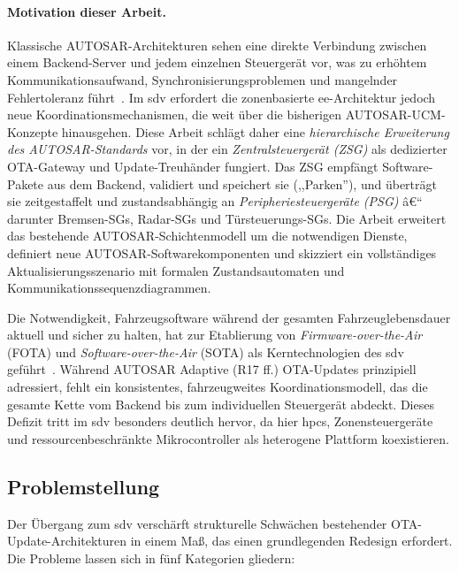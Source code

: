 ﻿\documentclass[12pt,a4paper,twoside]{article}
\begin{document}
\paragraph{Motivation dieser Arbeit.}
Klassische AUTOSAR-Architekturen sehen eine direkte Verbindung zwischen
einem Backend-Server und jedem einzelnen Steuergerät vor, was zu
erhöhtem Kommunikationsaufwand, Synchronisierungsproblemen und
mangelnder Fehlertoleranz führt~\cite{schneider2026ladekomm}. Im \gls{sdv}
erfordert die zonenbasierte \gls{ee}-Architektur jedoch neue
Koordinationsmechanismen, die weit über die bisherigen AUTOSAR-UCM-Konzepte
hinausgehen. Diese Arbeit schlägt daher eine
\emph{hierarchische Erweiterung des AUTOSAR-Standards} vor, in der ein
\emph{Zentralsteuergerät (ZSG)} als dedizierter OTA-Gateway und
Update-Treuhänder fungiert. Das ZSG empfängt Software-Pakete aus dem
Backend, validiert und speichert sie (,,Parken''), und überträgt sie
zeitgestaffelt und zustandsabhängig an \emph{Peripheriesteuergeräte (PSG)} â€“
darunter Bremsen-SGs, Radar-SGs und Türsteuerungs-SGs. Die Arbeit erweitert
das bestehende AUTOSAR-Schichtenmodell um die notwendigen Dienste,
definiert neue AUTOSAR-Softwarekomponenten und skizziert ein vollständiges
Aktualisierungsszenario mit formalen Zustandsautomaten und
Kommunikationssequenzdiagrammen.

Die Notwendigkeit, Fahrzeugsoftware während der gesamten Fahrzeuglebensdauer
aktuell und sicher zu halten, hat zur Etablierung von
\textit{Firmware-over-the-Air} (FOTA) und
\textit{Software-over-the-Air} (SOTA) als Kerntechnologien des
\gls{sdv} geführt~\cite{nilsson2008key}. Während AUTOSAR Adaptive (R17 ff.)
OTA-Updates prinzipiell adressiert, fehlt ein konsistentes, fahrzeugweites
Koordinationsmodell, das die gesamte Kette vom Backend bis zum individuellen
Steuergerät abdeckt. Dieses Defizit tritt im \gls{sdv} besonders deutlich
hervor, da hier \glspl{hpc}, Zonensteuergeräte und ressourcenbeschränkte
Mikrocontroller als heterogene Plattform koexistieren.

\subsection{Problemstellung}
\label{subsec:problemstellung}

Der Übergang zum \gls{sdv} verschärft strukturelle Schwächen bestehender
OTA-Update-Architekturen in einem Maß, das einen grundlegenden Redesign
erfordert. Die Probleme lassen sich in fünf Kategorien gliedern:
\end{document}

